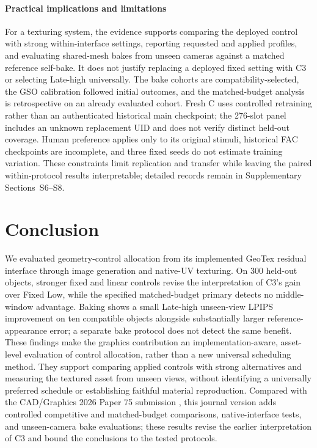 \documentclass[times,twocolumn,final]{elsarticle}
\begin{document}
\paragraph{Practical implications and limitations}
For a texturing system, the evidence supports comparing the deployed control with strong within-interface settings, reporting requested and applied profiles, and evaluating shared-mesh bakes from unseen cameras against a matched reference self-bake. It does not justify replacing a deployed fixed setting with C3 or selecting Late-high universally. The bake cohorts are compatibility-selected, the GSO calibration followed initial outcomes, and the matched-budget analysis is retrospective on an already evaluated cohort. Fresh C uses controlled retraining rather than an authenticated historical main checkpoint; the 276-slot panel includes an unknown replacement UID and does not verify distinct held-out coverage. Human preference applies only to its original stimuli, historical FAC checkpoints are incomplete, and three fixed seeds do not estimate training variation. These constraints limit replication and transfer while leaving the paired within-protocol results interpretable; detailed records remain in Supplementary Sections~S6--S8.

\section{Conclusion}
\label{sec:conclusion}

We evaluated geometry-control allocation from its implemented GeoTex residual interface through image generation and native-UV texturing. On 300 held-out objects, stronger fixed and linear controls revise the interpretation of C3's gain over Fixed Low, while the specified matched-budget primary detects no middle-window advantage. Baking shows a small Late-high unseen-view LPIPS improvement on ten compatible objects alongside substantially larger reference-appearance error; a separate bake protocol does not detect the same benefit. These findings make the graphics contribution an implementation-aware, asset-level evaluation of control allocation, rather than a new universal scheduling method. They support comparing applied controls with strong alternatives and measuring the textured asset from unseen views, without identifying a universally preferred schedule or establishing faithful material reproduction. Compared with the CAD/Graphics 2026 Paper 75 submission \cite{che2026cadgraphics}, this journal version adds controlled competitive and matched-budget comparisons, native-interface tests, and unseen-camera bake evaluations; these results revise the earlier interpretation of C3 and bound the conclusions to the tested protocols.
\end{document}
